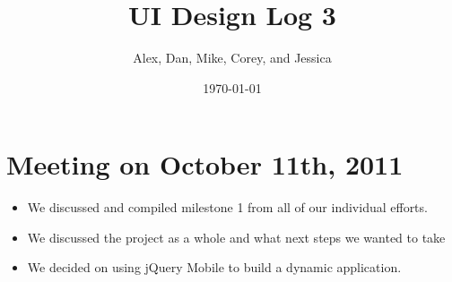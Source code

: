 \documentclass{article}
\title{UI Design Log 3}
\author{Alex, Dan, Mike, Corey, and Jessica}
\date{\today}
\begin{document}
\maketitle
\section{Meeting on October 11th, 2011}
\begin{itemize}
\item We discussed and compiled milestone 1 from all of our individual efforts.
\item We discussed the project as a whole and what next steps we wanted to take
\item We decided on using jQuery Mobile to build a dynamic application.
\end{itemize}
\end{document}

